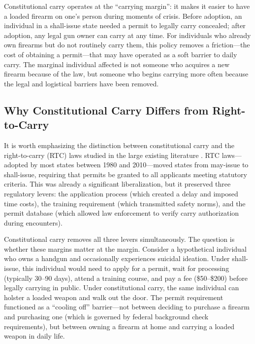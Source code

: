 \documentclass[12pt]{article}
\begin{document}
Constitutional carry operates at the ``carrying margin'': it makes it easier to have a loaded firearm on one's person during moments of crisis. Before adoption, an individual in a shall-issue state needed a permit to legally carry concealed; after adoption, any legal gun owner can carry at any time. For individuals who already own firearms but do not routinely carry them, this policy removes a friction---the cost of obtaining a permit---that may have operated as a soft barrier to daily carry. The marginal individual affected is not someone who acquires a new firearm because of the law, but someone who begins carrying more often because the legal and logistical barriers have been removed.

\subsection{Why Constitutional Carry Differs from Right-to-Carry}

It is worth emphasizing the distinction between constitutional carry and the right-to-carry (RTC) laws studied in the large existing literature \citep{lott1997more, donohue2019right, aneja2014impact, deSimone2013}. RTC laws---adopted by most states between 1980 and 2010---moved states from may-issue to shall-issue, requiring that permits be granted to all applicants meeting statutory criteria. This was already a significant liberalization, but it preserved three regulatory levers: the application process (which created a delay and imposed time costs), the training requirement (which transmitted safety norms), and the permit database (which allowed law enforcement to verify carry authorization during encounters).

Constitutional carry removes all three levers simultaneously. The question is whether these margins matter at the margin. Consider a hypothetical individual who owns a handgun and occasionally experiences suicidal ideation. Under shall-issue, this individual would need to apply for a permit, wait for processing (typically 30--90 days), attend a training course, and pay a fee (\$50--\$200) before legally carrying in public. Under constitutional carry, the same individual can holster a loaded weapon and walk out the door. The permit requirement functioned as a ``cooling off'' barrier---not between deciding to purchase a firearm and purchasing one (which is governed by federal background check requirements), but between owning a firearm at home and carrying a loaded weapon in daily life.
\end{document}
